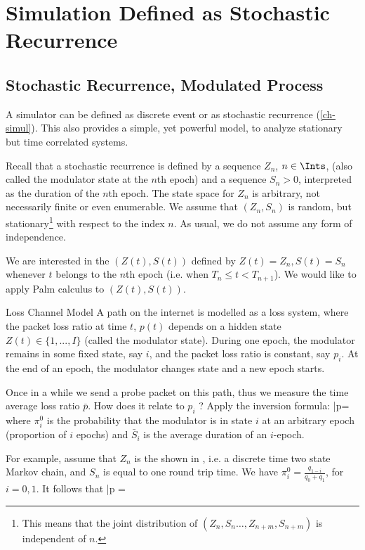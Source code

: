 \section{Simulation Defined as Stochastic Recurrence}
\label{sec-freeze}
\subsection{Stochastic Recurrence, Modulated Process} A simulator can be defined as discrete event or as
stochastic recurrence (\cref{ch-simul}). This also provides a
simple, yet powerful model, to analyze stationary but time
correlated systems.

Recall that a stochastic recurrence is defined by a sequence
$Z_n$, $n \in \Ints$, (also called the modulator state at the
$n$th epoch) and a sequence $S_n
>0$, interpreted as the duration of the $n$th epoch. The state space
for $Z_n$ is arbitrary, not necessarily finite or even enumerable.
We assume that $(Z_n, S_n)$ is random, but stationary\footnote{This
means that the joint distribution of $(Z_{n},S_n
\ldots,Z_{n+m},S_{n+m})$ is independent of $n$.} with respect to the
index $n$. As usual, we do not assume any form of independence.

We are interested in the  $(Z(t), S(t))$
defined by $Z(t)=Z_n, S(t)=S_n$ whenever $t$ belongs to the $n$th
epoch (i.e. when $T_n \leq t < T_{n+1}$). We would like to apply
Palm calculus to $(Z(t), S(t))$.

\begin{figure}
  \label{fig-palm-gilbert}
\end{figure}


\begin{ex}{Loss Channel Model} A path on the internet is modelled as a
loss system, where the packet loss ratio at time $t$, $p(t)$ depends
on a hidden state $Z(t)\in \{1,...,I\}$ (called the modulator
state). During one epoch, the modulator remains in some fixed state,
say $i$, and the packet loss ratio is constant, say $p_i$. At the
end of an epoch, the modulator changes state and a new epoch starts.

Once in a while we send a probe packet on this path, thus we
measure the time average loss ratio $\bar{p}$. How does it
relate to $p_i$ ? Apply the inversion formula:
 \ben \bar{p}=
 \een
 where $\pi^0_i$ is the probability that the modulator is in state
 $i$ at an arbitrary epoch (proportion of $i$ epochs) and $\bar{S}_i$
 is the average duration
 of an $i$-epoch.

For example, assume that $Z_n$ is the 
shown in , i.e. a discrete time two
state Markov chain, and $S_n$ is equal to one round trip time.
We have $\pi^0_i= \frac{q_{1-i}}{q_0+q_1}$, for $i=0,1$. It
follows that
 \ben
 \bar{p} = 
  \een
\end{ex}

